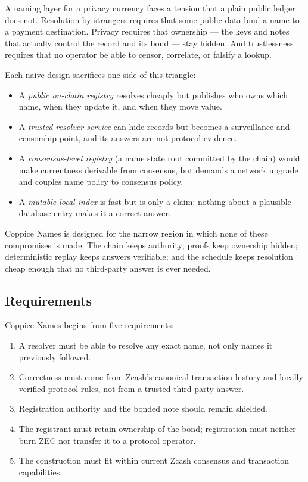 \documentclass[11pt]{article}
\begin{document}
A naming layer for a privacy currency faces a tension that a plain public
ledger does not. Resolution by strangers requires that some public data bind a
name to a payment destination. Privacy requires that ownership --- the keys
and notes that actually control the record and its bond --- stay hidden. And
trustlessness requires that no operator be able to censor, correlate, or
falsify a lookup.

Each naive design sacrifices one side of this triangle:

\begin{itemize}
\item A \emph{public on-chain registry} resolves cheaply but publishes who
owns which name, when they update it, and when they move value.
\item A \emph{trusted resolver service} can hide records but becomes a
surveillance and censorship point, and its answers are not protocol evidence.
\item A \emph{consensus-level registry} (a name state root committed by the
chain) would make currentness derivable from consensus, but demands a network
upgrade and couples name policy to consensus policy.
\item A \emph{mutable local index} is fast but is only a claim: nothing about
a plausible database entry makes it a correct answer.
\end{itemize}

Coppice Names is designed for the narrow region in which none of these
compromises is made. The chain keeps authority; proofs keep ownership hidden;
deterministic replay keeps answers verifiable; and the schedule keeps
resolution cheap enough that no third-party answer is ever needed.

\subsection{Requirements}

Coppice Names begins from five requirements:

\begin{enumerate}
\item A resolver must be able to resolve any exact name, not only names it
previously followed.
\item Correctness must come from Zcash's canonical transaction history and
locally verified protocol rules, not from a trusted third-party answer.
\item Registration authority and the bonded note should remain shielded.
\item The registrant must retain ownership of the bond; registration must
neither burn ZEC nor transfer it to a protocol operator.
\item The construction must fit within current Zcash consensus and transaction
capabilities.
\end{enumerate}
\end{document}
